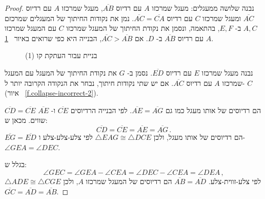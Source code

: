 \begin{proof}

נבנה שלושה ממעגלים: מעגל שמרכזו
$A$
עם רדיוס
$\overline{AB}$,
מעגל שמרכזו
$A$
עם רדיוס
$\overline{AC}$
ומעגל שמרכזו
$C$
עם רדיוס
$\overline{AC}=\overline{CA}$.
נמן את נקודות החיתוך של המעגלים שמרכזם 
$A,C$
ב-%
$E,F$,
בהתאמה, ונסמן את נקודת החיתוך של המעגל שמרכזו
$C$
עם המעגל שמרכזו 
$A$
עם רדיוס
$\overline{AB}$
ב-%
$D$.
אם
$\overline{AC}>\overline{AB}$,
הבנייה היא כפי שרואים באיור%
~\ref{f.collapse-incorrect-1}.
\begin{figure}[tb]
\begin{center}
\end{center}
\caption{בניית עבור העתקת קו (1)}\label{f.collapse-incorrect-1}
\end{figure}

נבנה מעגל שמרכזו 
$E$
עם רדיוס 
$\overline{ED}$.
נסמן ב-%
$G$
את נקודת החיתוך של המעגל עם המעגל שמרכזו
$A$
עם רדיוס 
$\overline{AC}$.
אם יש שתי נקודות חיתוך, נבחר את הנקודה הקרובה יותר ל-%
$C$
(איור~%
\ref{f.collapse-incorrect-2}).


$\overline{CD}=\overline{CE}$
הם רדיוסים של אותו מעגל כמו גם
$\overline{AE}=\overline{AG}$.
לפי הבנייה הרדיוסים 
$\overline{CE}$
ו-%
$\overline{AE}$
שווים. מכאן ש:
\[
\overline{CD} = \overline{CE} = \overline{AE} = \overline{AG}\,.
\]
$\overline{EG} = \overline{ED}$
הם רדיוסים של אותו מעגל, ולכן
$\triangle EAG\cong \triangle DCE$
לפי צלע-צלע-צלע ו-%
$\angle GEA = \angle DEC$.

בגלל ש:
\[
\angle GEC = \angle GEA \!-\!\angle CEA = \angle DEC\!-\!\angle CEA = \angle DEA\,,
\]
$\triangle ADE\cong\triangle CGE$ 
לפי צלע-זווית-צלע.
$\overline{AB}=\overline{AD}$
הם רדיוסים של המעגל שמרכזו
$A$,
ולכן
$\overline{GC}=\overline{AD}=\overline{AB}$.
\end{proof}

